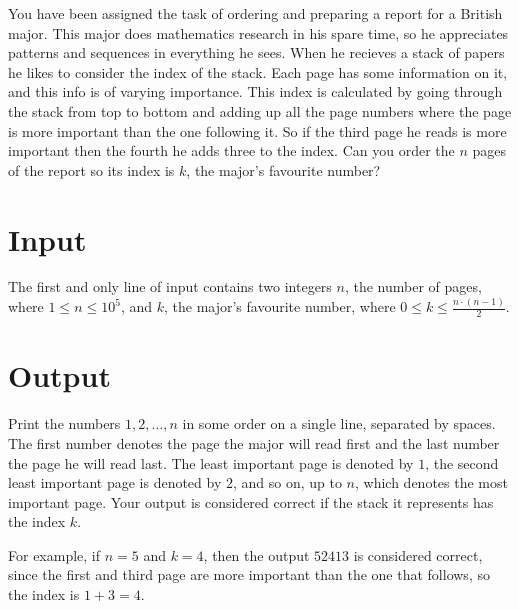 
You have been assigned the task of ordering and preparing a report for a British major. This major does mathematics
research in his spare time, so he appreciates patterns and sequences in everything he sees. When he recieves a stack
of papers he likes to consider the index of the stack. Each page has some information on it, and this info is of
varying importance. This index is calculated by going through the stack from top to bottom and adding up all the 
page numbers where the page is more important than the one following it. So if the third page he reads is more important
then the fourth he adds three to the index. Can you order the $n$ pages of the report so its index is $k$, the major's 
favourite number?

\section*{Input}
The first and only line of input contains two integers $n$, the number of pages, where $1 \leq n \leq 10^5$,
and $k$, the major's favourite number, where $0 \leq k \leq \frac{n \cdot (n-1)}{2}$.

\section*{Output}
Print the numbers $1, 2, \dots, n$ in some order on a single line, separated by spaces. The first number denotes the
page the major will read first and the last number the page he will read last.
The least important page is denoted by $1$,
the second least important page is denoted by $2$,
and so on, up to $n$, which denotes the most important page.
Your output is considered correct if the stack it represents has the index $k$.

For example, if $n=5$ and $k=4$, then the output $5 2 4 1 3$ is considered correct,
since the first and third page are more important than the one that follows, so the index is $1+3=4$.
